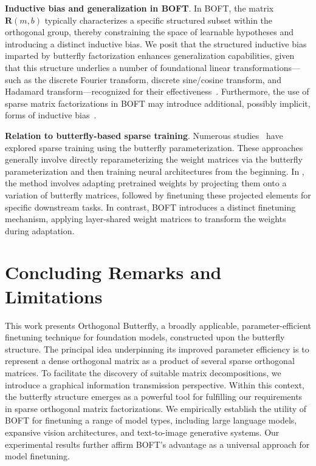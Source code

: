 \textbf{Inductive bias and generalization in BOFT}. In BOFT, the matrix $\bm{R}(m,b)$ typically characterizes a specific structured subset within the orthogonal group, thereby constraining the space of learnable hypotheses and introducing a distinct inductive bias. We posit that the structured inductive bias imparted by butterfly factorization enhances generalization capabilities, given that this structure underlies a number of foundational linear transformations—such as the discrete Fourier transform, discrete sine/cosine transform, and Hadamard transform—recognized for their effectiveness~\cite{dao2019kaleidoscope}. Furthermore, the use of sparse matrix factorizations in BOFT may introduce additional, possibly implicit, forms of inductive bias~\cite{gunasekar2017implicit,li2018algorithmic,liu2019neural}.

\textbf{Relation to butterfly-based sparse training}. Numerous studies~\cite{dao2019learning,dao2019kaleidoscope,chen2022pixelated,dao2022monarch} have explored sparse training using the butterfly parameterization. These approaches generally involve directly reparameterizing the weight matrices via the butterfly parameterization and then training neural architectures from the beginning. In \cite{dao2022monarch}, the method involves adapting pretrained weights by projecting them onto a variation of butterfly matrices, followed by finetuning these projected elements for specific downstream tasks. In contrast, BOFT introduces a distinct finetuning mechanism, applying layer-shared weight matrices to transform the weights during adaptation.



\section{Concluding Remarks and Limitations}

This work presents Orthogonal Butterfly, a broadly applicable, parameter-efficient finetuning technique for foundation models, constructed upon the butterfly structure. The principal idea underpinning its improved parameter efficiency is to represent a dense orthogonal matrix as a product of several sparse orthogonal matrices. To facilitate the discovery of suitable matrix decompositions, we introduce a graphical information transmission perspective. Within this context, the butterfly structure emerges as a powerful tool for fulfilling our requirements in sparse orthogonal matrix factorizations. We empirically establish the utility of BOFT for finetuning a range of model types, including large language models, expansive vision architectures, and text-to-image generative systems. Our experimental results further affirm BOFT’s advantage as a universal approach for model finetuning.

